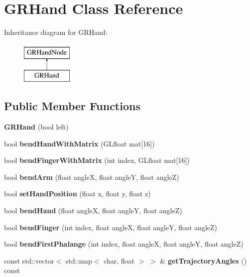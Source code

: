 \hypertarget{classGRHand}{}\section{G\+R\+Hand Class Reference}
\label{classGRHand}
Inheritance diagram for G\+R\+Hand\+:\begin{figure}[H]
\begin{center}
\leavevmode
\includegraphics[height=2.000000cm]{classGRHand}
\end{center}
\end{figure}
\subsection*{Public Member Functions}
\begin{DoxyCompactItemize}
\item 
\mbox{\label{classGRHand_a845b7cbd32ac3577f55e9c7c12747e7c}} 
{\bfseries G\+R\+Hand} (bool left)
\item 
\mbox{\label{classGRHand_a2a58b0f5dc46bf2418d791ed2f435d65}} 
bool {\bfseries bend\+Hand\+With\+Matrix} (G\+Lfloat mat\mbox{[}16\mbox{]})
\item 
\mbox{\label{classGRHand_a8457bfb78b7c76f9e468814a56c21fcb}} 
bool {\bfseries bend\+Finger\+With\+Matrix} (int index, G\+Lfloat mat\mbox{[}16\mbox{]})
\item 
\mbox{\label{classGRHand_a2a717841fcd95753b02cb720f120f3ac}} 
bool {\bfseries bend\+Arm} (float angleX, float angleY, float angleZ)
\item 
\mbox{\label{classGRHand_abecb79c664546c8f70bb44e3e5d8a380}} 
bool {\bfseries set\+Hand\+Position} (float x, float y, float z)
\item 
\mbox{\label{classGRHand_a928b05fa9d0d3345a121e2672cb566f1}} 
bool {\bfseries bend\+Hand} (float angleX, float angleY, float angleZ)
\item 
\mbox{\label{classGRHand_a4c271ad970e35c76aeb5350260509b0c}} 
bool {\bfseries bend\+Finger} (int index, float angleX, float angleY, float angleZ)
\item 
\mbox{\label{classGRHand_ab2d78e37761ebd5f0bd48cceed4a7ea6}} 
bool {\bfseries bend\+First\+Phalange} (int index, float angleX, float angleY, float angleZ)
\item 
\mbox{\label{classGRHand_a7d6157f075fac337723ad8646a9192ed}} 
const std\+::vector$<$ std\+::map$<$ char, float $>$ $>$ \& {\bfseries get\+Trajectory\+Angles} () const
\end{DoxyCompactItemize}
